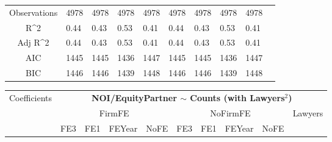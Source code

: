 \documentclass{article}
\begin{document}
\begin{table}[H]
\begin{tabular}{|clllllllll|}
   &  &  &  &  &  &  &  &  & \\ 
  \hline 
 Observations & 4978 & 4978 & 4978 & 4978 & 4978 & 4978 & 4978 & 4978 & \\ 
  R^2 & 0.44 & 0.43 & 0.53 & 0.41 & 0.44 & 0.43 & 0.53 & 0.41 & \\ 
  Adj R^2 & 0.44 & 0.43 & 0.53 & 0.41 & 0.44 & 0.43 & 0.53 & 0.41 & \\ 
  AIC & 1445 & 1445 & 1436 & 1447 & 1445 & 1445 & 1436 & 1447 & \\ 
  BIC & 1446 & 1446 & 1439 & 1448 & 1446 & 1446 & 1439 & 1448 & \\ 
   \hline
\end{tabular}
 
\end{table}


\begin{table}[H]
\centering
\begin{tabular}{|clllllllll|}
\hline
\multirow{3}{*}{Coefficients} & \multicolumn{9}{c|}{\textbf{NOI/EquityPartner $\sim$ Counts (with Lawyers$^2$)}} \\
\cline{2-10}
& \multicolumn{4}{c}{FirmFE} & \multicolumn{4}{c}{NoFirmFE} & \multirow{2}{*}{Lawyers} \\
\cline{2-9}
& FE3 & FE1 & FEYear & NoFE & FE3 & FE1 & FEYear & NoFE &  \\
\hline
 

\end{tabular}
\end{table}
\end{document}
